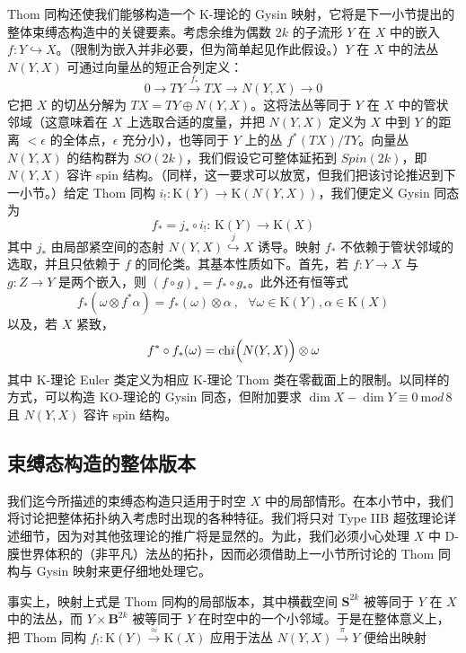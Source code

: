 \documentclass[11pt,a4paper]{ctexart}
\newcommand{\SrcRange}[2]{\marginpar{\raggedright\footnotesize 原文 p.#1}}
\begin{document}
Thom 同构还使我们能够构造一个 K-理论的 Gysin 映射，它将是下一小节提出的整体束缚态构造中的关键要素。考虑余维为偶数 \(2k\) 的子流形 \(Y\) 在 \(X\) 中的嵌入 \(f:Y\hookrightarrow X\)。（限制为嵌入并非必要，但为简单起见作此假设。）\(Y\) 在 \(X\) 中的法丛 \(N(Y,X)\) 可通过向量丛的短正合列定义： \[0\longrightarrow TY\stackrel{f_*}{\longrightarrow} TX\longrightarrow
N(Y,X)\longrightarrow0\] 它把 \(X\) 的切丛分解为 \(TX=TY\oplus N(Y,X)\)。这将法丛等同于 \(Y\) 在 \(X\) 中的管状邻域（这意味着在 \(X\) 上选取合适的度量，并把 \(N(Y,X)\) 定义为 \(X\) 中到 \(Y\) 的距离 \(<\epsilon\) 的全体点，\(\epsilon\) 充分小），也等同于 \(Y\) 上的丛 \(f^*(TX)/TY\)。向量丛 \(N(Y,X)\) 的结构群为 \(SO(2k)\)，我们假设它可整体延拓到 \(Spin(2k)\)，即 \(N(Y,X)\) 容许 spin 结构。（同样，这一要求可以放宽，但我们把该讨论推迟到下一小节。）给定 Thom 同构 \(i_!:{\mathrm K}(Y)\to{\mathrm K}(N(Y,X))\)，我们便定义 Gysin 同态为 \[f_*=j_*\circ i_!:\, {\mathrm K}(Y)\longrightarrow{\mathrm K}(X)\] 其中 \(j_*\) 由局部紧空间的态射 \(N(Y,X)\stackrel{j}{\hookrightarrow}X\) 诱导。映射 \(f_*\) 不依赖于管状邻域的选取，并且只依赖于 \(f\) 的同伦类。其基本性质如下。首先，若 \(f:Y\to X\) 与 \(g:Z\to Y\) 是两个嵌入，则 \((f\circ g)_*=f_*\circ g_*\)。此外还有恒等式 \[f_*(\omega\otimes f^*\alpha)=f_*(\omega)\otimes\alpha \ ,\ \ \
\forall\omega\in{\mathrm K}(Y),\alpha\in{\mathrm K}(X)\] 以及，若 \(X\) 紧致， \[f^*\circ f_*(\omega)=\mathrm{ch}i\Bigl(N(Y,X)\Bigr)\otimes\omega\] 其中 K-理论 Euler 类定义为相应 K-理论 Thom 类在零截面上的限制。以同样的方式，可以构造 KO-理论的 Gysin 同态，但附加要求 \(\dim X-\dim Y\equiv0~{\mathrm mod}\,8\) 且 \(N(Y,X)\) 容许 spin 结构。

\SrcRange{92}{92}
\subsection{束缚态构造的整体版本}\label{ux675fux7f1aux6001ux6784ux9020ux7684ux6574ux4f53ux7248ux672c}

我们迄今所描述的束缚态构造只适用于时空 \(X\) 中的局部情形。在本小节中，我们将讨论把整体拓扑纳入考虑时出现的各种特征。我们将只对 Type IIB 超弦理论详述细节，因为对其他弦理论的推广将是显然的。为此，我们必须小心处理 \(X\) 中 D-膜世界体积的（非平凡）法丛的拓扑，因而必须借助上一小节所讨论的 Thom 同构与 Gysin 映射来更仔细地处理它。

事实上，映射上式是 Thom 同构的局部版本，其中横截空间 \({\mathbf S}^{2k}\) 被等同于 \(Y\) 在 \(X\) 中的法丛，而 \(Y\times{\mathbf B}^{2k}\) 被等同于 \(Y\) 在时空中的一个小邻域。于是在整体意义上，把 Thom 同构 \(f_!:{\mathrm K}(Y)\stackrel{\approx}{\to}{\mathrm K}(X)\) 应用于法丛 \(N(Y,X)\stackrel{\pi}{\to}Y\) 便给出映射
\end{document}
